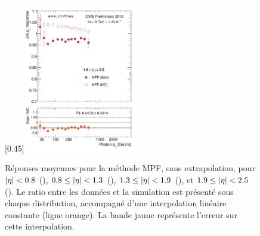 \begin{figure}[p!]
    \subcaptionbox{\label{fig:mpf_eta1925}}[0.45\textwidth]{\includegraphics[width=0.45\textwidth]{chapitre4/figs/resp_mpf/response_eta1925_mpf.pdf}}
    \caption{Réponses moyennes pour la méthode MPF, sans extrapolation, pour $\lvert \eta \rvert < \num{0.8}$ (), $\num{0.8} \leq \lvert \eta \rvert < \num{1.3}$ (), $\num{1.3} \leq \lvert \eta \rvert < \num{1.9}$ (), et $\num{1.9} \leq \lvert \eta \rvert < \num{2.5}$ (). Le ratio entre les données et la simulation est présenté sous chaque distribution, accompagné d'une interpolation linéaire constante (ligne orange). La bande jaune représente l'erreur sur cette interpolation.}
    \label{fig:mpf_resp}
\end{figure}


